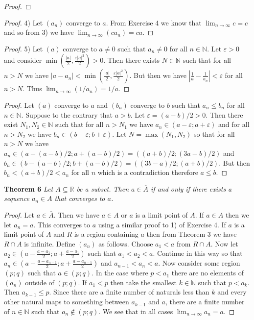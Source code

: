 \documentclass{article}
\begin{document}
\begin{flushleft}
\begin{proof}
\end{proof}
\begin{proof}
4) Let $(a_n)$ converge to $a$. From Exercise 4 we know that $\lim_{n \rightarrow \infty} c = c$ and so from 3) we have $\lim_{n \rightarrow \infty} (ca_n) = ca$.
\end{proof}
\begin{proof}
5) Let $(a)$ converge to $a \neq 0$ such that $a_n \neq 0$ for all $n \in \mathbb{N}$. Let $\varepsilon > 0$ and consider $\min \left ( \frac{|a|}{2}, \frac{\varepsilon |a|^2}{2} \right ) > 0$. Then there exists $N \in \mathbb{N}$ such that for all $n>N$ we have $|a-a_n| < \min \left ( \frac{|a|}{2}, \frac{\varepsilon |a|^2}{2} \right )$. But then we have $\left | \frac{1}{a} - \frac{1}{a_n} \right | < \varepsilon$ for all $n>N$. Thus $\lim_{n \rightarrow \infty} (1/a_n)=1/a$.
\end{proof}
\begin{proof}
Let $(a)$ converge to $a$ and $(b_n)$ converge to $b$ such that $a_n \leq b_n$ for all $n \in \mathbb{N}$. Suppose to the contrary that $a > b$. Let $\varepsilon = (a-b)/2 > 0$. Then there exist $N_1,N_2 \in \mathbb{N}$ such that for all $n>N_1$ we have $a_n \in (a - \varepsilon ; a + \varepsilon)$ and for all $n>N_2$ we have $b_n \in (b - \varepsilon ; b + \varepsilon)$. Let $N=\max (N_1,N_2)$ so that for all $n>N$ we have $a_n \in (a - (a-b)/2 ; a + (a-b)/2) = ((a+b)/2 ; (3a-b)/2)$ and $b_n \in (b - (a-b)/2 ; b + (a-b)/2) = ((3b-a)/2 ; (a+b)/2)$. But then $b_n < (a+b)/2 < a_n$ for all $n$ which is a contradiction therefore $a \leq b$.
\end{proof}

\textbf{Theorem 6}
\textsl{Let $A \subseteq \mathbb{R}$ be a subset. Then $a \in \overline{A}$ if and only if there exists a sequence $a_n \in A$ that converges to $a$.}
\begin{proof}
Let $a \in \overline{A}$. Then we have $a \in A$ or $a$ is a limit point of $A$. If $a \in A$ then we let $a_n = a$. This converges to $a$ using a similar proof to 1) of Exercise 4. If $a$ is a limit point of $A$ and $R$ is a region containing $a$ then from Theorem 3 we have $R \cap A$ is infinite. Define $(a_n)$ as follows. Choose $a_1 < a$ from $R \cap A$. Now let $a_2 \in (a - \frac{a-a_1}{2} ; a + \frac{a - a_1}{2})$ such that $a_1 < a_2 < a$. Continue in this way so that $a_n \in (a - \frac{a-a_{n-1}}{2} ; a + \frac{a-a_{n-1}}{2})$ and $a_{n-1} < a_n < a$. Now consider some region $(p;q)$ such that $a \in (p;q)$. In the case where $p<a_1$ there are no elements of $(a_n)$ outside of $(p;q)$. If $a_1 < p$ then take the smallest $k \in \mathbb{N}$ such that $p<a_k$. Then $a_{k-1} \leq p$. Since there are a finite number of naturals less than $k$ and every other natural maps to something between $a_{k-1}$ and $a$, there are a finite number of $n \in \mathbb{N}$ such that $a_n \notin (p;q)$. We see that in all cases $\lim_{n \rightarrow \infty} a_n = a$.\newline


\end{proof}
\end{flushleft}
\end{document}
